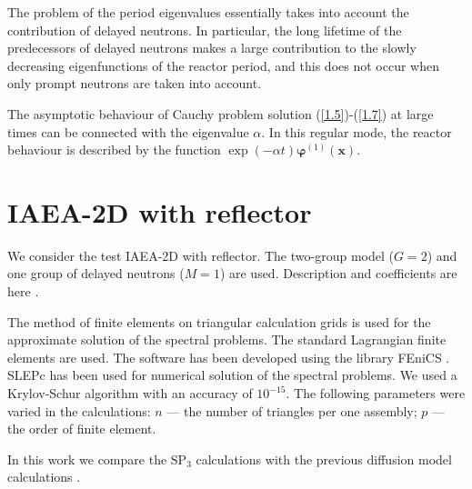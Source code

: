 \documentclass[a4paper]{jpconf}
\begin{document}
The problem of the period eigenvalues essentially takes into account the contribution of delayed neutrons.
In particular, the long lifetime of the predecessors of delayed neutrons makes a large contribution to the slowly decreasing eigenfunctions of the reactor period, and this does not occur when only prompt neutrons are taken into account.

The asymptotic behaviour of Cauchy problem solution (\ref{1.5})-(\ref{1.7}) at large times can be connected with the eigenvalue $\alpha$.
In this regular mode, the reactor behaviour is described by the function $\exp(-\alpha t) \bm \varphi^{(1)}(\bm x)$.

\section{IAEA-2D with reflector}
We consider the test IAEA-2D with reflector.
The two-group model ($G = 2$) and one group of delayed neutrons ($M = 1$) are used. 
Description and coefficients are here \cite{chao1995}.

The method of finite elements \cite{brenner2008} on triangular calculation grids is used for the approximate solution of the spectral problems. 
The standard Lagrangian finite elements are used.
The software has been developed using the library FEniCS \cite{logg2012}.
SLEPc has been used for numerical solution of the spectral problems.
We used a Krylov-Schur algorithm with an accuracy of $10^{-15}$.
The following parameters were varied in the calculations:
$n$ --- the number of triangles per one assembly; 
$p$ --- the order of finite element.

In this work we compare the $\mathrm{SP_3}$ calculations with the previous diffusion model calculations \cite{avvakumov2014}.
\end{document}
